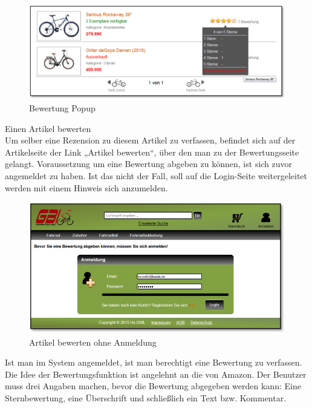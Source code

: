 \begin{figure}[H]
\begin{center}
\includegraphics[width=12cm]{Bilder/Michael_Abbildung10-BewertungPopup.png}
\end{center}
\caption{Bewertung Popup}
\end{figure}

Einen Artikel bewerten
\\
Um selber eine Rezension zu diesem Artikel zu verfassen, befindet sich auf der Artikelseite der Link „Artikel bewerten“, über den man zu der Bewertungsseite gelangt. 
Voraussetzung um eine Bewertung abgeben zu können, ist sich zuvor angemeldet zu haben. Ist das nicht der Fall, soll auf die Login-Seite weitergeleitet werden mit einem Hinweis sich anzumelden.

\begin{figure}[H]
\begin{center}
\includegraphics[width=12cm]{Bilder/Michael_Abbildung11-ArtikelBewertenOhneAnmeldung.png}
\end{center}
\caption{Artikel bewerten ohne Anmeldung}
\end{figure}

Ist man im System angemeldet, ist man berechtigt eine Bewertung zu verfassen.
Die Idee der Bewertungsfunktion ist angelehnt an die von Amazon. Der Benutzer muss drei Angaben machen, bevor die Bewertung abgegeben werden kann: Eine Sternbewertung, eine Überschrift und schließlich ein Text bzw. Kommentar. 

